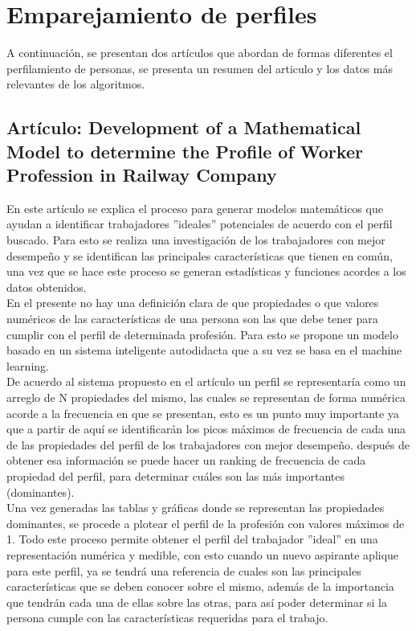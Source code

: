  \newpage
 
\section{Emparejamiento de perfiles}

A continuación, se presentan dos artículos que abordan de formas diferentes el perfilamiento de personas, se presenta un resumen del articulo y los datos más relevantes de los algoritmos.\\

\subsection{Artículo: Development of a Mathematical Model to determine the Profile of Worker Profession in Railway Company }

   En este artículo se explica el proceso para generar modelos matemáticos que ayudan a identificar trabajadores ''ideales'' potenciales de acuerdo con el perfil buscado. Para esto se realiza una investigación de los trabajadores con mejor desempeño y se identifican las principales características que tienen en común, una vez que se hace este proceso se generan estadísticas y funciones acordes a los datos obtenidos.  \\
  
  En el presente no hay una definición clara de que propiedades o que valores numéricos de las características de una persona son las que debe tener para cumplir con el perfil de determinada profesión. Para esto se propone un modelo basado en un sistema inteligente autodidacta que a su vez se basa en el machine learning. \\
    
    De acuerdo al sistema propuesto en el artículo un perfil se representaría como un arreglo de N propiedades del mismo, las cuales se representan de forma numérica acorde a la frecuencia en que se presentan, esto es un punto muy importante ya que a partir de aquí se identificarán los picos máximos de frecuencia de cada una de las propiedades del perfil de los trabajadores con mejor desempeño. después de obtener esa información se puede hacer un ranking de frecuencia de cada propiedad del perfil, para determinar cuáles son las más importantes (dominantes). \\
    
    Una vez generadas las tablas y gráficas donde se representan las propiedades dominantes, se procede a plotear el perfil de la profesión con valores máximos de 1. Todo este proceso permite obtener el perfil del trabajador ''ideal'' en una representación numérica y medible, con esto cuando un nuevo aspirante aplique para este perfil, ya se tendrá una referencia de cuales son las principales características que se deben conocer sobre el mismo, además de la importancia que tendrán cada una de ellas sobre las otras, para así poder determinar si la persona cumple con las características requeridas para el trabajo. \\
    
